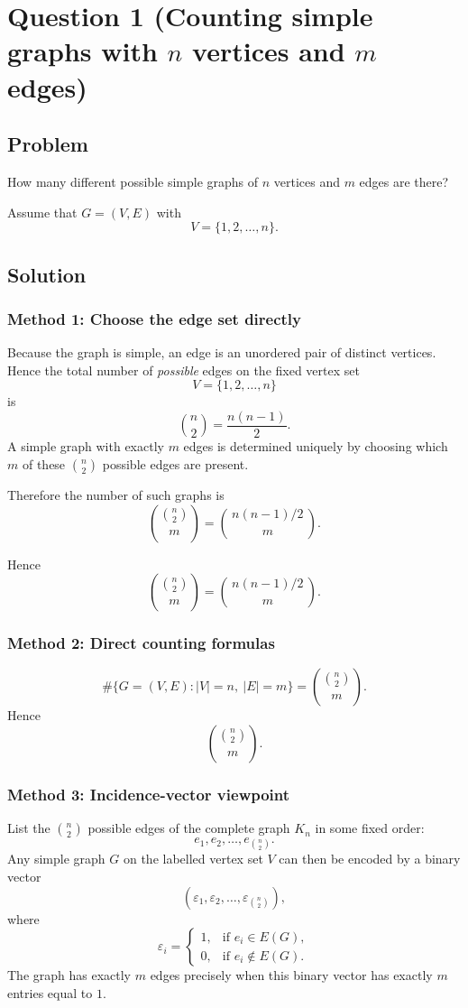 \documentclass[12pt]{article}
\begin{document}
\section{Question 1 (Counting simple graphs with \(n\) vertices and \(m\) edges)}

\subsection{Problem}
How many different possible simple graphs of \(n\) vertices and \(m\) edges are there?

Assume that \(G=(V,E)\) with
\[
V=\{1,2,\dots,n\}.
\]

\subsection{Solution}

\subsubsection{Method 1: Choose the edge set directly}
Because the graph is simple, an edge is an unordered pair of distinct vertices. Hence the total number of \emph{possible} edges on the fixed vertex set
\[
V=\{1,2,\dots,n\}
\]
is
\[
\binom{n}{2}=\frac{n(n-1)}{2}.
\]
A simple graph with exactly \(m\) edges is determined uniquely by choosing which \(m\) of these \(\binom{n}{2}\) possible edges are present.

Therefore the number of such graphs is
\[
\binom{\binom{n}{2}}{m}
=
\binom{\,n(n-1)/2\,}{m}.
\]

Hence
\[
\boxed{\binom{\binom{n}{2}}{m}=\binom{\,n(n-1)/2\,}{m}.}
\]

\subsubsection{Method 2: Direct counting formulas}
\[
\#\{G=(V,E):|V|=n,\ |E|=m\}
=
\binom{\binom{n}{2}}{m}.
\]
Hence
\[
\boxed{\binom{\binom{n}{2}}{m}.}
\]
\subsubsection{Method 3: Incidence-vector viewpoint}
List the \(\binom{n}{2}\) possible edges of the complete graph \(K_n\) in some fixed order:
\[
e_1,e_2,\dots,e_{\binom{n}{2}}.
\]
Any simple graph \(G\) on the labelled vertex set \(V\) can then be encoded by a binary vector
\[
(\varepsilon_1,\varepsilon_2,\dots,\varepsilon_{\binom{n}{2}}),
\]
where
\[
\varepsilon_i=
\begin{cases}
1, & \text{if } e_i\in E(G),\\
0, & \text{if } e_i\notin E(G).
\end{cases}
\]
The graph has exactly \(m\) edges precisely when this binary vector has exactly \(m\) entries equal to \(1\).
\end{document}
